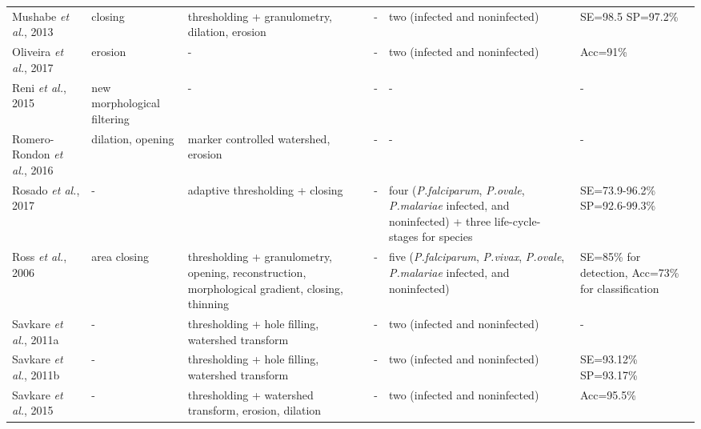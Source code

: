 \begin{longtable}{C{1.4cm} C{1.5cm} C{2.1cm} C{1.5cm} C{2.7cm} C{2.2cm} }
Mushabe \emph{et al.}, 2013  &
   	closing &
   	thresholding + granulometry, dilation, erosion  &
   	- &
   	two (infected and noninfected) &
   	SE=98.5 SP=97.2\% \vspace{0.6cm} \\	

Oliveira \emph{et al.}, 2017  &
   	erosion &
   	-  &
   	- &
   	two (infected and noninfected) &
   	Acc=91\% \vspace{0.6cm} \\

Reni \emph{et al.}, 2015  &
   	new morphological filtering &
   	-  &
   	- &
   	- &
   	- \vspace{0.6cm} \\

Romero-Rondon \emph{et al.}, 2016  &
   	dilation, opening &
   	marker controlled watershed, erosion  &
   	- &
   	- &
   	- \vspace{0.6cm} \\

Rosado \emph{et al.}, 2017  &
   	- &
   	adaptive thresholding + closing  &
   	- &
   	four (\emph{P.falciparum}, \emph{P.ovale}, \emph{P.malariae} infected, and noninfected) +
three life-cycle-stages for species &
   	SE=73.9-96.2\% SP=92.6-99.3\% \vspace{0.6cm} \\

Ross \emph{et al.}, 2006  &
   	area closing &
   	thresholding + granulometry, opening, reconstruction, morphological gradient, closing, thinning  &
    - &
   	five (\emph{P.falciparum}, \emph{P.vivax}, \emph{P.ovale}, \emph{P.malariae} infected, and noninfected) &
   	SE=85\% for detection, Acc=73\% for classification
  	 \vspace{0.6cm} \\


Savkare \emph{et al.}, 2011a  &
   	- &
   	thresholding + hole filling, watershed transform  &
   	- &
   	two (infected and noninfected) &
   	- \vspace{0.6cm} \\

Savkare \emph{et al.}, 2011b  &
   	- &
   	thresholding + hole filling, watershed transform  &
   	- &
   	two (infected and noninfected) &
   	SE=93.12\% SP=93.17\% \vspace{0.6cm} \\

Savkare \emph{et al.}, 2015  &
   	- &
   	thresholding + watershed transform, erosion, dilation  &
   	- &
   	two (infected and noninfected) &
   	Acc=95.5\% \vspace{0.6cm} \\


\end{longtable}
